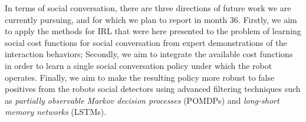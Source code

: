 \documentclass[a4paper,11pt]{report}
\begin{document}
In terms of social conversation, there are three directions of future work we are currently pursuing, and for which we plan to report in month 36. Firstly, we aim to apply the methods for IRL that were here presented to the problem of learning social cost functions for social conversation from expert demonstrations of the interaction behaviors; Secondly, we aim to integrate the available cost functions in order to learn a single social conversation policy under which the robot operates. Finally, we aim to make the resulting policy more robust to false positives from the robots social detectors using advanced filtering techniques such as \emph{partially observable Markov decision processes} (POMDPs) and \emph{long-short memory networks} (LSTMs).



\end{document}
